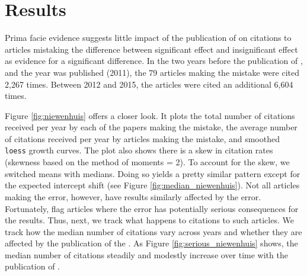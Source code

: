 \documentclass[12pt, letterpaper]{article}
\begin{document}
\section{Results}

Prima facie evidence suggests little impact of the publication of \citet{nieuwenhuis2011} on citations to articles mistaking the difference between significant effect and insignificant effect as evidence for a significant difference. In the two years before the publication of \citet{nieuwenhuis2011}, and the year \citet{nieuwenhuis2011} was published (2011), the 79 articles making the mistake were cited 2,267 times. Between 2012 and 2015, the articles were cited an additional 6,604 times.

Figure \ref{fig:niewenhuis} offers a closer look. It plots the total number of citations received per year by each of the papers making the mistake, the average number of citations received per year by articles making the mistake, and smoothed \texttt{loess} growth curves. The plot also shows there is a skew in citation rates (skewness based on the method of moments = 2). To account for the skew, we switched means with medians. Doing so yields a pretty similar pattern except for the expected intercept shift (see Figure \ref{fig:median_niewenhuis}). Not all articles making the error, however, have results similarly affected by the error. Fortunately, \citet{nieuwenhuis2011} flag articles where the error has potentially serious consequences for the results. Thus, next, we track what happens to citations to such articles. We track how the median number of citations vary across years and whether they are affected by the publication of the \citet{nieuwenhuis2011}. As Figure \ref{fig:serious_niewenhuis} shows, the median number of citations steadily and modestly increase over time with the publication of \citet{nieuwenhuis2011}.
\end{document}
